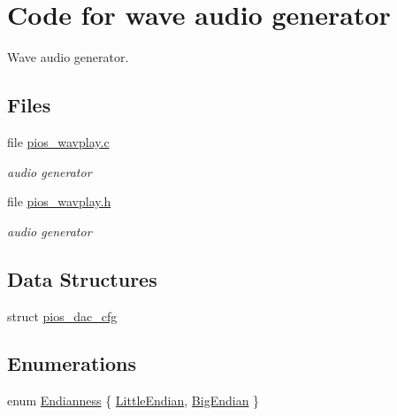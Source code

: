 \hypertarget{group___p_i_o_s___w_a_v_p_l_a_y}{\section{Code for wave audio generator}
\label{group___p_i_o_s___w_a_v_p_l_a_y}
}


Wave audio generator.  


\subsection*{Files}
\begin{DoxyCompactItemize}
\item 
file \hyperlink{pios__wavplay_8c}{pios\-\_\-wavplay.\-c}
\begin{DoxyCompactList}\small\item\em audio generator \end{DoxyCompactList}\item 
file \hyperlink{pios__wavplay_8h}{pios\-\_\-wavplay.\-h}
\begin{DoxyCompactList}\small\item\em audio generator \end{DoxyCompactList}\end{DoxyCompactItemize}
\subsection*{Data Structures}
\begin{DoxyCompactItemize}
\item 
struct \hyperlink{structpios__dac__cfg}{pios\-\_\-dac\-\_\-cfg}
\end{DoxyCompactItemize}
\subsection*{Enumerations}
\begin{DoxyCompactItemize}
\item 
enum \hyperlink{group___p_i_o_s___w_a_v_p_l_a_y_ga4f3ee12da30a1e47c52dc137b4627cab}{Endianness} \{ \hyperlink{group___p_i_o_s___w_a_v_p_l_a_y_gga4f3ee12da30a1e47c52dc137b4627caba66c163903fb08aef1735714dbb818cc7}{Little\-Endian}, 
\hyperlink{group___p_i_o_s___w_a_v_p_l_a_y_gga4f3ee12da30a1e47c52dc137b4627cabab90b00401d08d0ecc6b6c2c54db50d6b}{Big\-Endian}
 \}
\end{DoxyCompactItemize}
